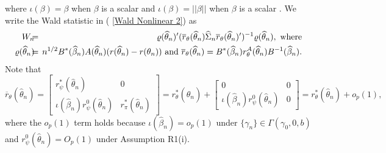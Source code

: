 \documentclass[12pt,titlepage,final,oneside,letterpaper]{article}
\begin{document}
where $\iota (\beta )=\beta $ when $\beta $ is a scalar and $\iota (\beta
)=||\beta ||$ when $\beta $ is a scalar . We write the Wald statistic in (%
\ref{Wald Nonlinear 2}) as%
\begin{eqnarray}
W_{n}\hspace{-0.08in} &=&\hspace{-0.08in}\varrho (\widehat{\theta }%
_{n})^{\prime }(\overline{r}_{\theta }(\widehat{\theta }_{n})\widehat{\Sigma 
}_{n}\overline{r}_{\theta }(\widehat{\theta }_{n})^{\prime })^{-1}\varrho (%
\widehat{\theta }_{n}),\text{ where}  \label{Wald Nonlinear 3} \\
\varrho (\widehat{\theta }_{n})\hspace{-0.08in} &=&\hspace{-0.08in}%
n^{1/2}B^{\ast }(\widehat{\beta }_{n})A(\widehat{\theta }_{n})(r(\widehat{%
\theta }_{n})-r(\theta _{n}))\text{ and }\overline{r}_{\theta }(\widehat{%
\theta }_{n})=B^{\ast }(\widehat{\beta }_{n})r_{\theta }^{A}(\widehat{\theta 
}_{n})B^{-1}(\widehat{\beta }_{n}).  \notag
\end{eqnarray}%
Note that 
\begin{equation}
\overline{r}_{\theta }(\widehat{\theta }_{n})=\left[ 
\begin{array}{cc}
r_{\psi }^{\ast }(\widehat{\theta }_{n}) & 0 \\ 
\iota (\widehat{\beta }_{n})r_{\psi }^{0}(\widehat{\theta }_{n}) & r_{\pi
}^{\ast }(\widehat{\theta }_{n})%
\end{array}%
\right] =r_{\theta }^{\ast }(\widehat{\theta }_{n})+\left[ 
\begin{array}{cc}
0 & 0 \\ 
\iota (\widehat{\beta }_{n})r_{\psi }^{0}(\widehat{\theta }_{n}) & 0%
\end{array}%
\right] =r_{\theta }^{\ast }(\widehat{\theta }_{n})+o_{p}(1),  \label{r_bar}
\end{equation}%
where the $o_{p}\left( 1\right) $ term holds because $\iota (\widehat{\beta }%
_{n})=o_{p}\left( 1\right) $ under $\{\gamma _{n}\}\in \Gamma (\gamma
_{0},0,b)$ and $r_{\psi }^{0}(\widehat{\theta }_{n})=O_{p}(1)$ under
Assumption R1(i).
\end{document}
